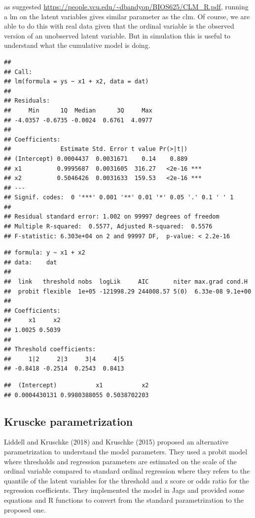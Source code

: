 \documentclass[
  man,floatsintext]{apa6}
\begin{document}
as suggested \url{https://people.vcu.edu/~dbandyop/BIOS625/CLM_R.pdf}, running a lm on the latent variables gives similar parameter as the clm. Of course, we are able to do this with real data given that the ordinal variable is the observed version of an unobserved latent variable. But in simulation this is useful to understand what the cumulative model is doing.

\begin{verbatim}
## 
## Call:
## lm(formula = ys ~ x1 + x2, data = dat)
## 
## Residuals:
##     Min      1Q  Median      3Q     Max 
## -4.0357 -0.6735 -0.0024  0.6761  4.0977 
## 
## Coefficients:
##              Estimate Std. Error t value Pr(>|t|)    
## (Intercept) 0.0004437  0.0031671    0.14    0.889    
## x1          0.9995687  0.0031605  316.27   <2e-16 ***
## x2          0.5046426  0.0031633  159.53   <2e-16 ***
## ---
## Signif. codes:  0 '***' 0.001 '**' 0.01 '*' 0.05 '.' 0.1 ' ' 1
## 
## Residual standard error: 1.002 on 99997 degrees of freedom
## Multiple R-squared:  0.5577, Adjusted R-squared:  0.5576 
## F-statistic: 6.303e+04 on 2 and 99997 DF,  p-value: < 2.2e-16
\end{verbatim}

\begin{verbatim}
## formula: y ~ x1 + x2
## data:    dat
## 
##  link   threshold nobs  logLik     AIC       niter max.grad cond.H 
##  probit flexible  1e+05 -121998.29 244008.57 5(0)  6.33e-08 9.1e+00
## 
## Coefficients:
##     x1     x2 
## 1.0025 0.5039 
## 
## Threshold coefficients:
##     1|2     2|3     3|4     4|5 
## -0.8418 -0.2514  0.2543  0.8413
\end{verbatim}

\begin{verbatim}
##  (Intercept)           x1           x2 
## 0.0004430131 0.9980388055 0.5038702203
\end{verbatim}

\subsection{Kruscke parametrization}\label{kruscke-parametrization}

Liddell and Kruschke (2018) and Kruschke (2015) proposed an alternative parametrization to understand the model parameters. They used a probit model where thresholds and regression parameters are estimated on the scale of the ordinal variable compared to standard ordinal regression where they refers to the quantile of the latent variables for the threshold and z score or odds ratio for the regression coefficients. They implemented the model in Jags and provided some equations and R functions to convert from the standard parametrization to the proposed one.
\end{document}
